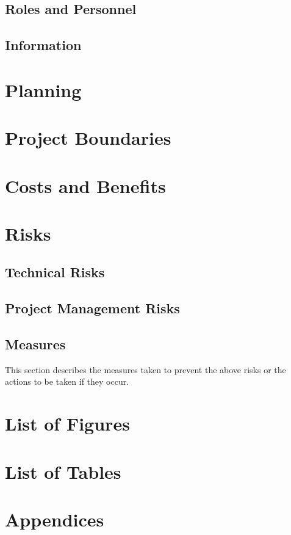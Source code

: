\documentclass{article}
\begin{document}
\subsection{Roles and Personnel}
\subsection{Information}


\newpage

\section{Planning}


\newpage

\section{Project Boundaries}


\newpage

\section{Costs and Benefits}


\newpage

\section{Risks}
\subsection{Technical Risks}
\subsection{Project Management Risks}
\subsection{Measures}
This section describes the measures taken to prevent the above risks or the actions to be taken if they occur.


\newpage

\section{List of Figures}

\section{List of Tables}

\section{Appendices}
\end{document}
